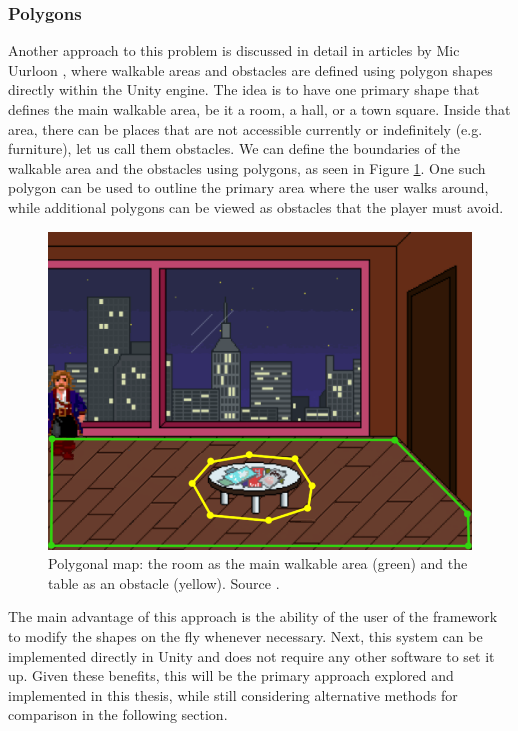 \subsubsection{Polygons}
Another approach to this problem is discussed in detail in articles by Mic Uurloon \cite{Uurloon1}\cite{Uurloon2}, where walkable areas and obstacles are defined using polygon shapes directly within the Unity engine. The idea is to have one primary shape that defines the main walkable area, be it a room, a hall, or a town square. Inside that area, there can be places that are not accessible currently or indefinitely (e.g. furniture), let us call them obstacles. We can define the boundaries of the walkable area and the obstacles using polygons, as seen in Figure \ref{fig:WS:Poly}. One such polygon can be used to outline the primary area where the user walks around, while additional polygons can be viewed as obstacles that the player must avoid.

\begin{figure}[H]
\centering
\includegraphics[width=.7\linewidth]{img/WS-polygons4.png}
\caption{Polygonal map: the room as the main walkable area (green) and the table as an obstacle (yellow). Source \cite{Uurloon1}.}
\label{fig:WS:Poly}
\end{figure}

The main advantage of this approach is the ability of the user of the framework to modify the shapes on the fly whenever necessary. Next, this system can be implemented directly in Unity and does not require any other software to set it up. Given these benefits, this will be the primary approach explored and implemented in this thesis, while still considering alternative methods for comparison in the following section. 

